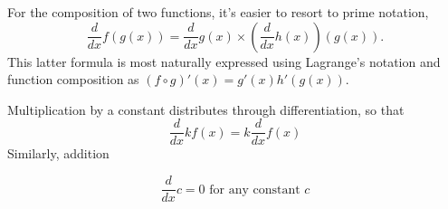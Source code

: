 For the composition of two functions, it's easier to resort to
prime notation, 
%
\begin{equation}
\frac{d}{dx} f(g(x)) = \frac{d}{dx} g(x) \times (\frac{d}{dx} h(x))(g(x)).
\end{equation}
%
This latter formula is most naturally expressed using Lagrange's
notation and function composition as $(f \circ g)'(x) = g'(x)
h'(g(x))$.

Multiplication by a constant distributes through differentiation, so
that
%
\begin{equation}
\frac{d}{dx} k f(x) = k \frac{d}{dx} f(x)
\end{equation}
%
Similarly, addition 





\begin{equation}
\frac{d}{dx} c = 0 \mbox{ for any constant } c
\end{equation}


